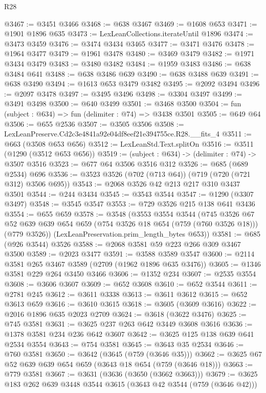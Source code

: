\begin{lexlean}{R28}
\begin{coremodule}
@3467 := @3451 @3466
@3468 := @638 @3467
@3469 := @1608 @653
@3471 := @1901 @1896 @635
@3473 := LexLeanCollections.iterateUntil @1896
@3474 := @3473 @3459
@3476 := @3474 @3434 @3465
@3477 := @3471 @3476
@3478 := @1964 @3477
@3479 := @1961 @3478
@3480 := @3469 @3479
@3482 := @1971 @3434 @3479
@3483 := @3480 @3482
@3484 := @1959 @3483
@3486 := @638 @3484 @641
@3488 := @638 @3486 @639
@3490 := @638 @3488 @639
@3491 := @638 @3490
@3494 := @1613 @653 @3479 @3482
@3495 := @2092 @3494
@3496 := @2097 @3478
@3497 := @3495 @3496
@3498 := @3304 @3497
@3499 := @3491 @3498
@3500 := @640 @3499
@3501 := @3468 @3500
@3504 := fun (subject : @634) => fun (delimiter : @74) => @3438 @3501
@3505 := @649 @64
@3506 := @655 @2536
@3507 := @3505 @3506
@3508 := LexLeanPreserve.Cd2c3e4841a92e04df8eef21e394755ce.R28.__fits_4
@3511 := @663 (@3508 @653 @656)
@3512 := LexLeanStd.Text.splitOn
@3516 := @3511 (@1290 (@3512 @653 @656))
@3519 := (subject : @634) -> (delimiter : @74) -> @3507 @3516
@3523 := @677 @64 @3506 @3516 @312
@3526 := @685 (@689 @2534) @696
@3536 := @3523 @3526 (@702 (@713 @64)) (@719 (@720 (@721 @312) @3506 @695))
@3543 := @2068 @3526 @42 @213 @217 @310 @3437 @3501
@3544 := @244 @3434
@3545 := @3543 @3544
@3547 := @1290 (@3307 @3497)
@3548 := @3545 @3547
@3553 := @729 @3526 @215 @138 @641 @3436
@3554 := @655 @659
@3578 := @3548
    (@3553
      @3554
      @3544
      (@745
        @3526
        @67
        @52
        @639
        @639
        @654
        @659
        (@754 @3526 @18 @654 (@759 (@760 @3526 @18)))
        (@779 @3526))
      (LexLeanPreservation.prim_length_bytes @653))
@3581 := @685 (@926 @3544) @3526
@3588 := @2068 @3581 @59 @223 @266 @309 @3467 @3500
@3589 := @2023 @3477
@3591 := @3588 @3589 @3547
@3600 := @2114 @3581 @265 @3467 @3589 (@2709 (@1962 @1896 @635 @3476))
@3605 := @1346 @3581 @229 @264 @3450 @3466
@3606 := @1352 @234
@3607 := @2535 @3554
@3608 := @3606 @3607
@3609 := @652 @3608
@3610 := @652 @3544
@3611 := @2781 @245
@3612 := @3611 @3338
@3613 := @3611 @3612
@3615 := @652 @3613 @659
@3616 := @3610 @3615
@3618 := @3605 (@3609 @3616)
@3622 := @2016 @1896 @635 @2023 @2709
@3624 := @3618 (@3622 @3476)
@3625 := @745 @3581
@3631 := @3625 @237 @263 @642 @3449 @3608 @3616
@3636 := @1378 @3581 @234 @236 @642 @3607
@3642 := @3625 @125 @138 @639 @641 @2534 @3554
@3643 := @754 @3581
@3645 := @3643 @35 @2534
@3646 := @760 @3581
@3650 := @3642 (@3645 (@759 (@3646 @35)))
@3662 := @3625 @67 @52 @639 @639 @654 @659 (@3643 @18 @654 (@759 (@3646 @18)))
@3663 := @779 @3581
@3667 := @3631 (@3636 (@3650 (@3662 @3663)))
@3679 := @3625 @183 @262 @639 @3448 @3544 @3615 (@3643 @42 @3544 (@759 (@3646 @42)))

\end{coremodule}
\end{lexlean}
